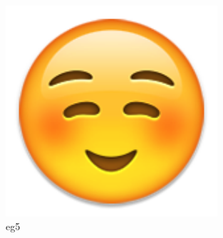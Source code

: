 \begin{solution}
\begin{enumerate}[nosep,label=(\arabic*)]
\begin{itemize}
\begin{latexamplev}[]
\begin{figure}[H]
\begin{minipage}[b]{0.3\textwidth}
    \includegraphics[width=0.7\textwidth]{./pic/05.png}
    \caption{eg5}
  \end{minipage}
 \end{figure}
\end{latexamplev}


\end{itemize}
\end{enumerate}
\end{solution}
